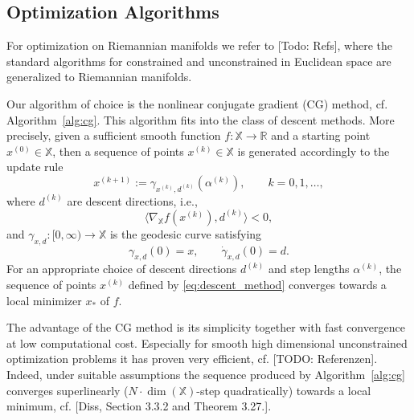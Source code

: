 \documentclass[%
a4paper,11pt,DIV=11,%
abstract=on%
]{scrartcl}
\begin{document}
\subsection{Optimization Algorithms}
For optimization on Riemannian manifolds we refer to {\color{blue}[Todo: Refs]}, where the standard algorithms for constrained and unconstrained in Euclidean space are generalized to Riemannian manifolds. 

Our algorithm of choice is the nonlinear conjugate gradient (CG) method, cf. Algorithm~\ref{alg:cg}. This algorithm fits into the class of descent methods. More precisely, given a sufficient smooth function $f:\mathbb X \to \mathbb R$ and a starting point $x^{(0)} \in \mathbb X$, then a sequence of points $x^{(k)} \in \mathbb X$ is generated accordingly to the update rule
\begin{equation}
  \label{eq:descent_method}
  x^{(k+1)} := \gamma_{x^{(k)},d^{(k)}}(\alpha^{(k)}), \qquad k=0,1,\dots,
\end{equation}
where $d^{(k)}$ are descent directions, i.e.,
\[
  \langle \nabla_{\mathbb X} f(x^{(k)}), d^{(k)} \rangle <  0,
\]
and $\gamma_{x,d}:[0,\infty)\to \mathbb X$ is the geodesic curve satisfying
\begin{equation}
  \label{eq:geodesic_descent}
  \gamma_{x,d}(0) = x, \qquad \dot \gamma_{x,d}(0) = d.
\end{equation}
For an appropriate choice of descent directions $d^{(k)}$ and step lengths $\alpha^{(k)}$, the sequence of points $x^{(k)}$ defined by  \eqref{eq:descent_method} converges towards a local minimizer $x_{*}$ of $f$.

The advantage of the CG method is its simplicity together with fast convergence at low computational cost. 
Especially for smooth high dimensional unconstrained optimization problems it has proven very efficient, cf. {\color{blue}[TODO: Referenzen]}. 
Indeed, under suitable assumptions the sequence produced by Algorithm~\ref{alg:cg} converges superlinearly ($N\cdot\dim(\mathbb X)$-step quadratically) 
towards a local minimum, cf. {\color{blue} [Diss, Section 3.3.2 and Theorem 3.27.]}.
\end{document}

